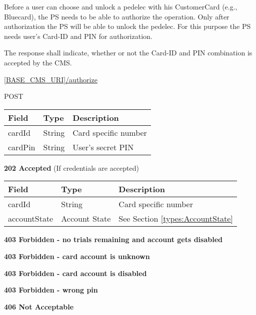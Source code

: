 Before a user can choose and unlock a pedelec with his CustomerCard (e.g., Bluecard), the \acs{PS} needs to be able to authorize the operation. Only after authorization the \acs{PS} will be able to unlock the pedelec. For this purpose the \acs{PS} needs user's Card-ID and PIN for authorization.

The response shall indicate, whether or not the Card-ID and PIN combination is accepted by the \acs{CMS}.

 \url{[BASE_CMS_URI]/authorize}

 POST

\begin{table}[!h]
\vspace{-7mm}
\begin{tabularx}{\linewidth}{ | l | l |  X | }
  \hline
  \rowcolor{table-head}
  Field & Type & Description \\
  \hline
  	cardId & String 		& Card specific number\\
  	cardPin & String			& User's secret PIN \\
    \hline
\end{tabularx}
\end{table}

\textbf{202 Accepted} (If credentials are accepted)

\begin{table}[!h]
\begin{tabularx}{\linewidth}{ | l | l | X | }
  \hline
  \rowcolor{table-head}
  Field & Type & Description \\
  \hline
  	cardId & String 		& Card specific number\\
  	accountState & Account State & See Section \ref{types:AccountState} \\
    \hline
\end{tabularx}
\end{table}
\textbf{403 Forbidden - no trials remaining and account gets disabled}

\textbf{403 Forbidden - card account is unknown}

\textbf{403 Forbidden - card account is disabled}

\textbf{403 Forbidden - wrong pin}

\textbf{406 Not Acceptable}

